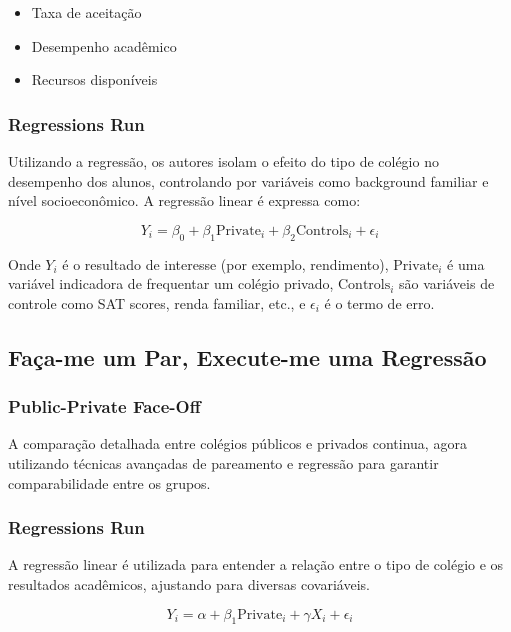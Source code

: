 \documentclass[a4paper,12pt]{article}[abntex2]
\begin{document}
\begin{itemize}
    \item Taxa de aceitação
    \item Desempenho acadêmico
    \item Recursos disponíveis
\end{itemize}

\subsubsection*{Regressions Run}

Utilizando a regressão, os autores isolam o efeito do tipo de colégio no desempenho dos alunos, controlando por variáveis como background familiar e nível socioeconômico. A regressão linear é expressa como:

\begin{equation}
    Y_i = \beta_0 + \beta_1 \text{Private}_i + \beta_2 \text{Controls}_i + \epsilon_i
\end{equation}

Onde \(Y_i\) é o resultado de interesse (por exemplo, rendimento), \(\text{Private}_i\) é uma variável indicadora de frequentar um colégio privado, \(\text{Controls}_i\) são variáveis de controle como SAT scores, renda familiar, etc., e \(\epsilon_i\) é o termo de erro.

\subsection{Faça-me um Par, Execute-me uma Regressão}

\subsubsection*{Public-Private Face-Off}

A comparação detalhada entre colégios públicos e privados continua, agora utilizando técnicas avançadas de pareamento e regressão para garantir comparabilidade entre os grupos.

\subsubsection*{Regressions Run}

A regressão linear é utilizada para entender a relação entre o tipo de colégio e os resultados acadêmicos, ajustando para diversas covariáveis.

\begin{equation}
    Y_i = \alpha + \beta_1 \text{Private}_i + \gamma X_i + \epsilon_i
\end{equation}
\end{document}
